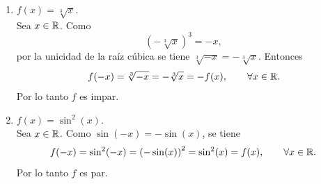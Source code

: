 \documentclass[12pt,a4paper]{article}
\begin{document}
    \begin{solucion}
        \begin{enumerate}
            \item[(a)] $f(x)=\sqrt[3]{x}$.\\
            Sea $x\in\mathbb{R}$. Como
            \begin{equation*}
                \left(-\sqrt[3]{x}\right)^{3}=-x,
            \end{equation*}
            por la unicidad de la raíz cúbica se tiene $\sqrt[3]{-x}=-\sqrt[3]{x}$. Entonces
            \begin{equation*}
                f(-x)=\sqrt[3]{-x}=-\sqrt[3]{x}=-f(x),\qquad\forall x\in\mathbb{R}.
            \end{equation*}
            Por lo tanto $f$ es impar.
            \item[(b)] $f(x)=\sin^{2}(x)$.\\
            Sea $x\in\mathbb{R}$. Como $\sin(-x)=-\sin(x)$, se tiene
            \begin{equation*}
                f(-x)=\sin^{2}(-x)=\left(-\sin(x)\right)^{2}=\sin^{2}(x)=f(x),\qquad\forall x\in\mathbb{R}.
            \end{equation*}
            Por lo tanto $f$ es par.
        \end{enumerate}
    \end{solucion}
\end{document}
